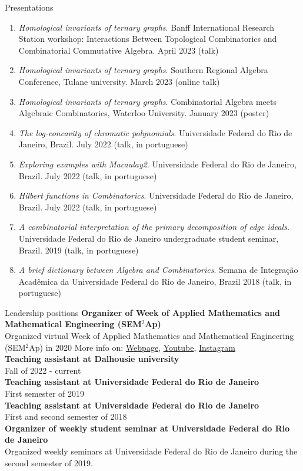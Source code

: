 \documentclass{resume} %
\begin{document}
\begin{rSection}{Presentations}
\begin{enumerate}
        \item \textit{Homological invariants of ternary graphs}. Banff International Research Station workshop: Interactions Between Topological Combinatorics and Combinatorial Commutative Algebra. April 2023 (talk)
        \item \textit{Homological invariants of ternary graphs}. Southern Regional Algebra Conference, Tulane university. March 2023 (online talk)
        \item \textit{Homological invariants of ternary graphs}. Combinatorial Algebra meets Algebraic Combinatorics, Waterloo University. January 2023 (poster)
        \item \textit{The log-concavity of chromatic polynomials}. Universidade Federal do Rio de Janeiro, Brazil. July 2022 (talk, in portuguese)
        \item \textit{Exploring examples with Macaulay2}. Universidade Federal do Rio de Janeiro, Brazil. July 2022 (talk, in portuguese)
        \item \textit{Hilbert functions in Combinatorics}. Universidade Federal do Rio de Janeiro, Brazil. July 2022 (talk, in portuguese)
        \item \textit{A combinatorial interpretation of the primary decomposition of edge ideals}. Universidade Federal do Rio de Janeiro undergraduate student seminar, Brazil. 2019 (talk, in portuguese)
        \item \textit{A brief dictionary between Algebra and Combinatorics}. Semana de Integração Acadêmica da Universidade Federal do Rio de Janeiro, Brazil 2018 (talk, in portuguese)
    \end{enumerate}
\end{rSection}

\newpage

\begin{rSection}{Leadership positions}
{\bf Organizer of Week of Applied Mathematics and Mathematical Engineering (SEM$^2$Ap)}
\\
Organized virtual Week of Applied Mathematics and Mathematical Engineering (SEM$^2$Ap) in 2020
{\scriptsize More info on:  \href{http://semap.rio.br/2020/en/}{Webpage},   \href{https://www.youtube.com/channel/UC14NMQ5cOsSuLrAQGGa2T4Q}{Youtube}, 
\href{https://www.instagram.com/semap.rio/}{Instagram}}
\\
{\bf Teaching assistant at Dalhousie university}
\\
Fall of 2022 - current
\\
{\bf Teaching assistant at Universidade Federal do Rio de Janeiro} 
\\
First semester of 2019
\\
{\bf Teaching assistant at Universidade Federal do Rio de Janeiro} 
\\
First and second semester of 2018
\\
{\bf Organizer of weekly student seminar at Universidade Federal do Rio de Janeiro}
\\
Organized weekly seminars at Universidade Federal do Rio de Janeiro during the second semester of 2019.
\end{rSection}
\end{document}
